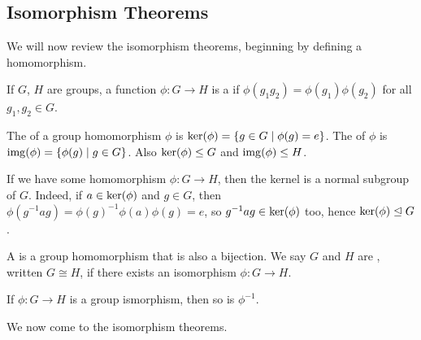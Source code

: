 \documentclass[a4paper]{scrreprt}
\begin{document}
\subsection{Isomorphism Theorems}

We will now review the isomorphism theorems, beginning by defining a homomorphism.

\begin{definition}
	If $G$, $H$ are groups, a function $\phi: G \rightarrow H$ is a  if
	$
	\phi(g_1 g_2) = \phi(g_1) \phi(g_2)
	$
	for all $g_1, g_2 \in G$.
\end{definition}

\begin{definition}
	The  of a group homomorphism $\phi$ is $\operatorname{ker}(\phi) = \{ g \in G \mid \phi(g) = e\}$.
	The  of $\phi$ is $\operatorname{img}(\phi) = \{ \phi(g) \mid g \in G\}$. Also $\operatorname{ker}(\phi) \leq G$ and $\operatorname{img}(\phi) \leq H$.
\end{definition}



If we have some homomorphism $\phi: G \rightarrow H$, 
then the kernel is a normal subgroup of $G$. Indeed, if $a \in \operatorname{ker}(\phi)$ and $g \in G$, then $\phi(g^{-1}ag) = \phi(g)^{-1} \phi(a) \phi(g) = e$, so $g^{-1}ag \in \operatorname{ker}(\phi)$ too, hence $\operatorname{ker}(\phi) \trianglelefteq G$.

\begin{definition}
	A  is a group homomorphism that is also a bijection. We say $G$ and $H$ are , written $G \cong H$, if there exists an isomorphism $\phi:G \rightarrow H$.
\end{definition}

\begin{remark}
	If $\phi:G \rightarrow H$ is a group ismorphism, then so is $\phi^{-1}$.
\end{remark}

We now come to the isomorphism theorems.
\end{document}
